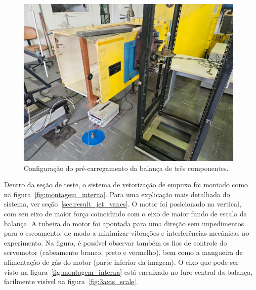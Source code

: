 \begin{figure}[htbp]
    \centering
    \includegraphics[height=0.45\textheight]{img/montagem_externa.jpeg}
    \caption{Configuração do pré-carregamento da balança de três componentes.}\label{fig:pre_loading}
\end{figure}

Dentro da seção de teste, o sistema de vetorização de empuxo foi montado como na figura~\ref{fig:montagem_interna}. Para uma explicação mais detalhada do sistema, ver seção~\ref{sec:result_jet_vanes}. O motor foi posicionado na vertical, com seu eixo de maior força coincidindo com o eixo de maior fundo de escala da balança. A tubeira do motor foi apontada para uma direção sem impedimentos para o escoamento, de modo a minimizar vibrações e interferências mecânicas no experimento. Na figura, é possível observar também os fios de controle do servomotor (cabeamento branco, preto e vermelho), bem como a mangueira de alimentação de gás do motor (parte inferior da imagem). O eixo que pode ser visto na figura~\ref{fig:montagem_interna} está encaixado no furo central da balança, facilmente visível na figura~\ref{fig:3axis_scale}.

